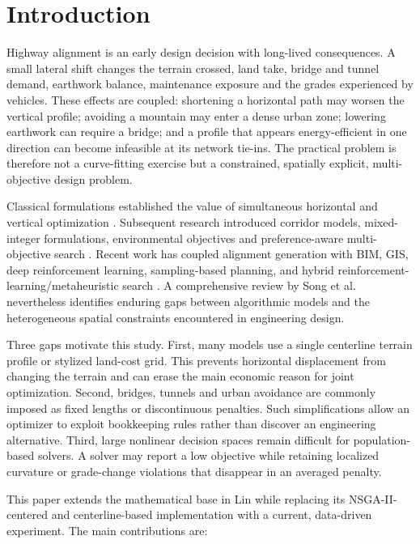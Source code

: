 \documentclass[preprint,12pt]{elsarticle}
\begin{document}
\linenumbers

\section{Introduction}

Highway alignment is an early design decision with long-lived consequences. A small lateral shift changes the terrain crossed, land take, bridge and tunnel demand, earthwork balance, maintenance exposure and the grades experienced by vehicles. These effects are coupled: shortening a horizontal path may worsen the vertical profile; avoiding a mountain may enter a dense urban zone; lowering earthwork can require a bridge; and a profile that appears energy-efficient in one direction can become infeasible at its network tie-ins. The practical problem is therefore not a curve-fitting exercise but a constrained, spatially explicit, multi-objective design problem.

Classical formulations established the value of simultaneous horizontal and vertical optimization \cite{chew1989,jong2003}. Subsequent research introduced corridor models, mixed-integer formulations, environmental objectives and preference-aware multi-objective search \cite{kang2012,mondal2015,hirpa2016,vazquez2018,akhmet2022}. Recent work has coupled alignment generation with BIM, GIS, deep reinforcement learning, sampling-based planning, and hybrid reinforcement-learning/metaheuristic search \cite{han2023,he2023,alhadad2024,pu2024,pu2026}. A comprehensive review by Song et al. \cite{songreview2023} nevertheless identifies enduring gaps between algorithmic models and the heterogeneous spatial constraints encountered in engineering design.

Three gaps motivate this study. First, many models use a single centerline terrain profile or stylized land-cost grid. This prevents horizontal displacement from changing the terrain and can erase the main economic reason for joint optimization. Second, bridges, tunnels and urban avoidance are commonly imposed as fixed lengths or discontinuous penalties. Such simplifications allow an optimizer to exploit bookkeeping rules rather than discover an engineering alternative. Third, large nonlinear decision spaces remain difficult for population-based solvers. A solver may report a low objective while retaining localized curvature or grade-change violations that disappear in an averaged penalty.

This paper extends the mathematical base in Lin \cite{lin2025} while replacing its NSGA-II-centered and centerline-based implementation with a current, data-driven experiment. The main contributions are:
\end{document}
